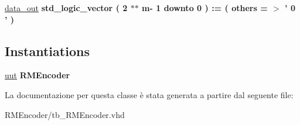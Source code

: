 \begin{DoxyCompactItemize}
\item 
\hypertarget{classtb___r_m_encoder_1_1_behavioral_ga15cecb94efad2e7b07fba82e97ac7a81}{\hyperlink{group___r_m_encoder_ga15cecb94efad2e7b07fba82e97ac7a81}{data\+\_\+out} {\bfseries \textcolor{comment}{std\+\_\+logic\+\_\+vector}\textcolor{vhdlchar}{ }\textcolor{vhdlchar}{(}\textcolor{vhdlchar}{ }\textcolor{vhdlchar}{ } \textcolor{vhdldigit}{2} \textcolor{vhdlchar}{$\ast$}\textcolor{vhdlchar}{$\ast$}\textcolor{vhdlchar}{ }\textcolor{vhdlchar}{ }\textcolor{vhdlchar}{ }\textcolor{vhdlchar}{m}\textcolor{vhdlchar}{-\/}\textcolor{vhdlchar}{ } \textcolor{vhdldigit}{1} \textcolor{vhdlchar}{ }\textcolor{keywordflow}{downto}\textcolor{vhdlchar}{ }\textcolor{vhdlchar}{ } \textcolor{vhdldigit}{0} \textcolor{vhdlchar}{ }\textcolor{vhdlchar}{)}\textcolor{vhdlchar}{ }\textcolor{vhdlchar}{ }\textcolor{vhdlchar}{ }\textcolor{vhdlchar}{\+:}\textcolor{vhdlchar}{=}\textcolor{vhdlchar}{ }\textcolor{vhdlchar}{(}\textcolor{vhdlchar}{ }\textcolor{vhdlchar}{ }\textcolor{keywordflow}{others}\textcolor{vhdlchar}{ }\textcolor{vhdlchar}{ }\textcolor{vhdlchar}{=}\textcolor{vhdlchar}{ }\textcolor{vhdlchar}{$>$}\textcolor{vhdlchar}{ }\textcolor{vhdlchar}{'}\textcolor{vhdlchar}{ } \textcolor{vhdldigit}{0} \textcolor{vhdlchar}{ }\textcolor{vhdlchar}{'}\textcolor{vhdlchar}{ }\textcolor{vhdlchar}{)}\textcolor{vhdlchar}{ }} }\label{classtb___r_m_encoder_1_1_behavioral_ga15cecb94efad2e7b07fba82e97ac7a81}

\end{DoxyCompactItemize}
\subsection*{Instantiations}
 \begin{DoxyCompactItemize}
\item 
\hypertarget{classtb___r_m_encoder_1_1_behavioral_a1619316ad715601eb5d3559db829ac05}{\hyperlink{classtb___r_m_encoder_1_1_behavioral_a1619316ad715601eb5d3559db829ac05}{uut}  {\bfseries R\+M\+Encoder}   }\label{classtb___r_m_encoder_1_1_behavioral_a1619316ad715601eb5d3559db829ac05}

\end{DoxyCompactItemize}


La documentazione per questa classe è stata generata a partire dal seguente file\+:\begin{DoxyCompactItemize}
\item 
R\+M\+Encoder/tb\+\_\+\+R\+M\+Encoder.\+vhd\end{DoxyCompactItemize}
